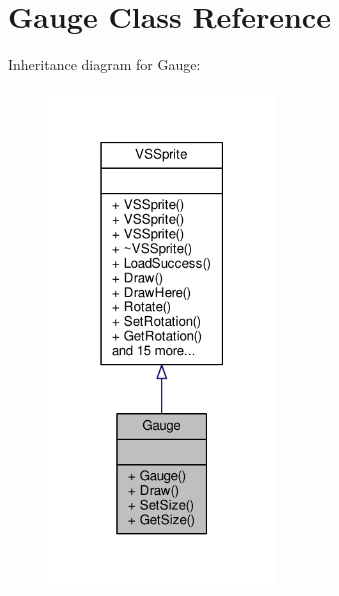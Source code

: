 \hypertarget{classGauge}{}\section{Gauge Class Reference}
\label{classGauge}


Inheritance diagram for Gauge\+:
\nopagebreak
\begin{figure}[H]
\begin{center}
\leavevmode
\includegraphics[width=171pt]{d1/da3/classGauge__inherit__graph}
\end{center}
\end{figure}


